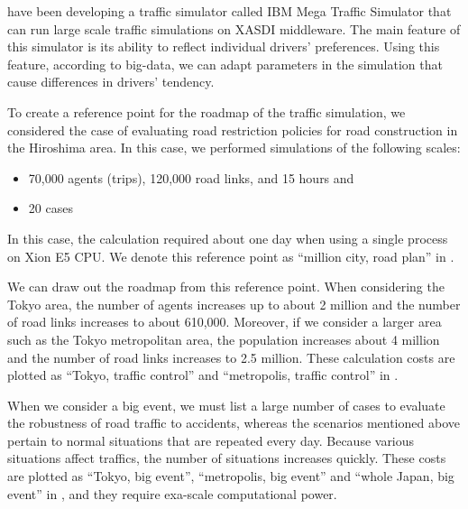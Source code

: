 \cite{osogami2013ibm} have been developing a traffic simulator called IBM Mega Traffic Simulator that can run large scale traffic simulations
on XASDI middleware.
The main feature of this simulator is its ability to reflect 
individual drivers' preferences.
Using this feature,
according to big-data,
we can adapt parameters in the simulation
that cause differences in drivers' tendency.

To create a reference point for the roadmap of the traffic
simulation,
we considered the case of evaluating road restriction policies
for road construction in the Hiroshima area\cite{Osogami2013b}.
In this case, we performed simulations of the following scales:
\begin{itemize}
  \item 70,000 agents (trips), 120,000 road links, and 15 hours and
  \item 20 cases
\end{itemize}
In this case, the calculation required about one day when using a single process
on Xion E5 CPU.
We denote this reference point as ``million city, road plan''
in .

We can draw out the roadmap from this reference point.
When considering the Tokyo area,
the number of agents increases up to about 2 million
and the number of road links increases to about 610,000.
Moreover, if we consider a larger area such as the Tokyo metropolitan area,
the population increases about 4 million and the number of road links increases to 2.5 million.
These calculation costs are plotted as ``Tokyo, traffic
control'' and ``metropolis, traffic control'' in
.

When we consider a big event,
we must list a large number of cases to evaluate the robustness
of road traffic to accidents,
whereas the scenarios mentioned above pertain to normal situations
that are repeated every day.
Because various situations affect traffics,
the number of situations increases quickly.
These costs are plotted as 
``Tokyo, big event'', ``metropolis, big event'' and ``whole Japan, big
event''
in , and they require exa-scale computational power.


